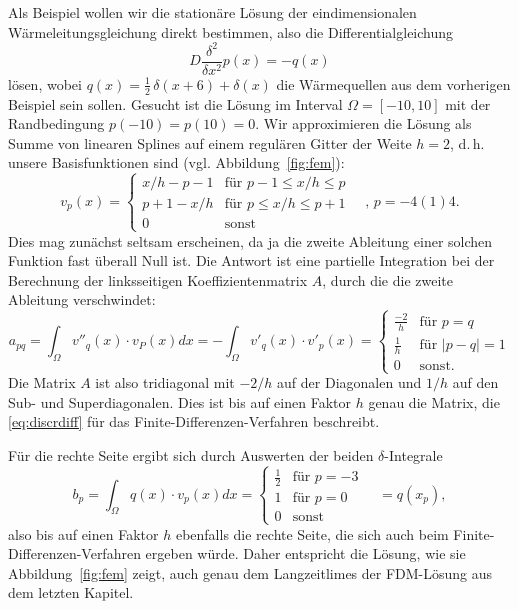 Als Beispiel wollen wir die stationäre Lösung der eindimensionalen
Wärmeleitungsgleichung direkt bestimmen, also die Differentialgleichung
\begin{equation}
  D\frac{\delta^2}{\delta x^2} p(x) = -q(x)
\end{equation}
lösen, wobei $q(x)= \frac{1}{2}\,\delta\left(x+6\right) + \delta(x)$ die Wärmequellen aus dem vorherigen Beispiel sein sollen. Gesucht ist die Lösung im Interval $\Omega=[-10,10]$ mit der Randbedingung $p(-10) = p(10) = 0$. Wir approximieren die Lösung
als Summe von linearen Splines auf einem regulären Gitter der Weite $h=2$, d.\,h.\, unsere
Basisfunktionen sind (vgl. Abbildung~\ref{fig:fem}):
\begin{equation}
	v_p(x) = \begin{cases}
		x/h - p - 1 & \text{für } p - 1 \le x/h \le p \\  
		p + 1 - x/h & \text{für } p \le x/h \le p + 1 \\
		0 & \text{sonst}
		\end{cases}\quad,\, p=-4(1)4.
\end{equation}
Dies mag zunächst seltsam erscheinen, da ja die zweite Ableitung einer solchen Funktion fast überall Null ist. Die Antwort ist eine partielle Integration bei der Berechnung der linksseitigen Koeffizientenmatrix $A$, durch die die zweite Ableitung verschwindet:
\begin{equation}
  a_{pq} = \int_\Omega v''_q(x)\cdot v_P(x) dx = -\int_\Omega v'_q(x)\cdot v'_p(x) =
  	\begin{cases}
	\frac{-2}{h} & \text{für } p=q \\
	\frac{1}{h}  & \text{für } \lvert p - q \rvert = 1\\
	0 & \text{sonst.}
	\end{cases}
\end{equation}
Die Matrix $A$ ist also tridiagonal mit $-2/h$ auf der Diagonalen und $1/h$ auf den Sub- und Superdiagonalen. Dies ist bis auf einen Faktor $h$ genau die Matrix, die \eqref{eq:discrdiff} für das Finite-Differenzen-Verfahren beschreibt.

Für die rechte Seite ergibt sich durch Auswerten der beiden $\delta$-Integrale
\begin{equation}
  b_p = \int_\Omega q(x)\cdot v_p(x) dx = \begin{cases}
  \frac{1}{2} & \text{für } p = -3 \\
  1           & \text{für } p = 0 \\
  0 & \text{sonst}
  \end{cases} \quad = q(x_p),
\end{equation}
also bis auf einen Faktor $h$ ebenfalls die rechte Seite, die sich auch beim Finite-Differenzen-Verfahren ergeben würde. Daher entspricht die Lösung, wie sie Abbildung~\ref{fig:fem} zeigt, auch genau dem Langzeitlimes der FDM-Lösung aus dem letzten Kapitel.

